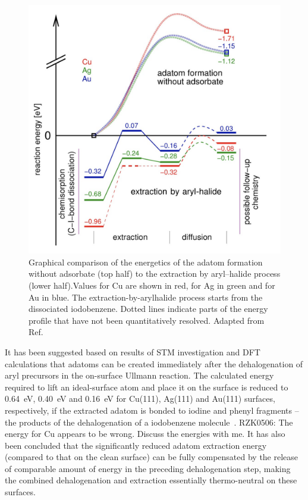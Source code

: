 \documentclass[%
 reprint,
 amsmath,amssymb,
 aps,
prb,
floatfix,
]{revtex4-2}
\newcommand{\lock}{\color{red}}
\newcommand{\lock}{\color{black}}
\newcommand{\comm}{\color{Purple}} %
\begin{document}
\begin{figure}[htb]
\centering
\includegraphics[width=0.75\columnwidth]{Fig/Adatom-formation.png}
\caption{Graphical comparison of the energetics of the adatom formation without adsorbate (top half) to the extraction by aryl–halide process (lower half).Values for Cu are shown in red, for Ag in green and for Au in blue. The extraction-by-arylhalide process starts from the dissociated iodobenzene. Dotted lines indicate parts of the energy profile that have not been quantitatively resolved. Adapted from Ref.~\cite{chemeurope2017}}
\label{fig:3}
\end{figure}

\fi

{\lock

It has been suggested based on results of STM investigation and DFT calculations that adatoms can be created immediately after the dehalogenation of aryl precursors in the on-surface Ullmann reaction. 
The calculated energy required to lift an ideal-surface atom and place it on the surface is reduced to \SI{0.64}{\electronvolt}, \SI{0.40}{\electronvolt} and \SI{0.16}{\electronvolt} for Cu(111), Ag(111) and Au(111) surfaces, respectively, if the extracted adatom is bonded to iodine and phenyl fragments -- the products of the dehalogenation of a iodobenzene molecule~\cite{chemeurope2017}. {\comm RZK0506: The energy for Cu appears to be wrong. Discuss the energies with me.}
%
It has also been concluded that the significantly reduced adatom extraction energy (compared to that on the clean surface) can be fully compensated by the release of comparable amount of energy in the preceding dehalogenation step, making the combined dehalogenation and extraction essentially thermo-neutral on these surfaces.


}
\end{document}

